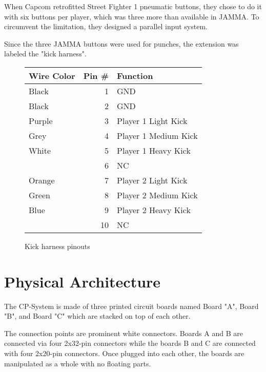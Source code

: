 When Capcom retrofitted Street Fighter 1 pneumatic buttons, they chose to do it with six buttons per player, which was three more than available in JAMMA. To circumvent the limitation, they designed a parallel input system. 

Since the three JAMMA buttons were used for punches, the extension was labeled the "kick harness".

\begin{figure}[H]

\begin{tabularx}{\textwidth}{lrX}
  \toprule    
  \textbf{Wire Color } & \textbf{ Pin \#}  & \textbf{Function } \\               
  \toprule   
  Black & 1 & GND \\
  Black & 2 & GND \\
  \toprule   
  Purple & 3 & Player 1 Light Kick \\
  Grey & 4 & Player 1 Medium Kick \\
  White & 5 & Player 1 Heavy Kick \\
  \toprule   
  & 6 & NC \\
  \toprule   
  Orange & 7 & Player 2 Light Kick\\
  Green & 8 & Player 2 Medium Kick\\
  Blue & 9 & Player 2 Heavy Kick\\
  \toprule   
  & 10 & NC \\
  \toprule   
\end{tabularx}
\caption*{Kick harness pinouts}
\end{figure}










  


\section{Physical Architecture}
 The CP-System is made of three printed circuit boards named Board "A", Board "B", and Board "C" which are stacked on top of each other.


\begin{figure}[H]
\centering
{}
\end{figure}

\pagebreak
The connection points are prominent white connectors. Boards A and B are connected via four 2x32-pin connectors while the boards B and C are connected with four 2x20-pin connectors.  Once plugged into each other, the boards are manipulated as a whole with no floating parts.


